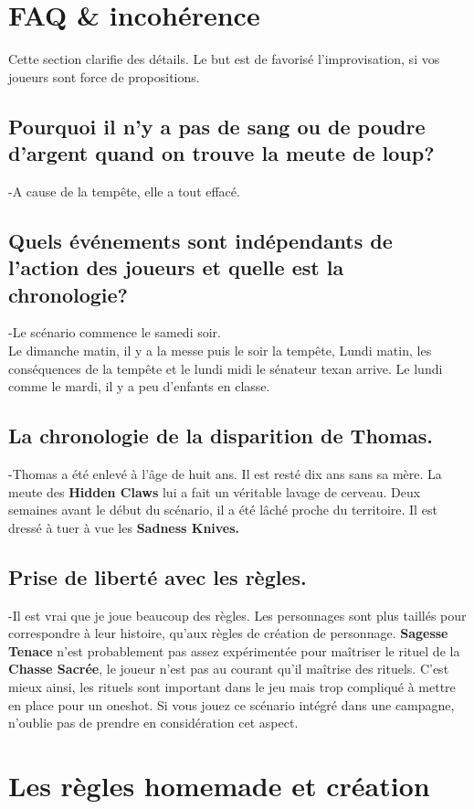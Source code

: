\documentclass[oneside,12pt]{book}
\newcommand{\Jessica}{\textbf{Sagesse Tenace} }
\newcommand{\Hidden}{\textbf{Hidden Claws} }
\begin{document}
\begin{flushleft}
\clearpage

\section{FAQ \& incohérence}
Cette section clarifie des détails. Le but est de favorisé l'improvisation, si vos joueurs sont force de propositions.
\subsection{Pourquoi il n'y a pas de sang ou de poudre d'argent quand on trouve la meute de loup?}
-A cause de la tempête, elle a tout effacé. 
\subsection{Quels événements sont indépendants de l'action des joueurs et quelle est la chronologie?}
-Le scénario commence le samedi soir. \\
Le dimanche matin, il y a la messe puis le soir la tempête, 
Lundi matin, les conséquences de la tempête et le lundi midi le sénateur texan arrive. Le lundi comme le mardi, 
il y a peu d'enfants en classe. 
\subsection{La chronologie de la disparition de Thomas.} 
-Thomas a été enlevé à l'âge de huit ans. Il est resté dix ans sans sa mère. 
La meute des \Hidden lui a fait un véritable lavage de cerveau. Deux semaines avant le début du scénario, 
il a été lâché proche du territoire. Il est dressé à tuer à vue les \textbf{Sadness Knives.}
\subsection{Prise de liberté avec les règles.} 
-Il est vrai que je joue beaucoup des règles. Les personnages sont plus taillés pour correspondre à 
leur histoire, qu'aux règles de création de personnage.
\Jessica  n'est probablement pas assez expérimentée pour maîtriser le rituel de la \textbf{Chasse Sacrée},
le joueur n'est pas au courant qu'il maîtrise des rituels.
C'est mieux ainsi, les rituels sont important dans le jeu mais trop compliqué à mettre en place pour un oneshot.
Si vous jouez ce scénario intégré dans une campagne, n'oublie pas de prendre en considération cet aspect.

\clearpage

\section{Les règles homemade et création}

\end{flushleft}
\end{document}
